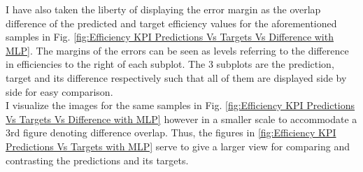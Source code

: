 \documentclass{report} %
\begin{document}
I have also taken the liberty of displaying the error margin as the overlap difference 
of the predicted and target efficiency values for the aforementioned samples in Fig. \ref{fig:Efficiency KPI Predictions Vs Targets Vs Difference with MLP}. 
The margins of the errors can be seen as levels referring to the difference in efficiencies to the right of each subplot. The 3 subplots are the prediction, target 
and its difference respectively such that all of them are displayed side by side for easy comparison. \\
I visualize the images for the same samples in Fig. \ref{fig:Efficiency KPI Predictions Vs Targets Vs Difference with MLP} however in a smaller scale to accommodate 
a 3rd figure denoting difference overlap. Thus, the figures in \ref{fig:Efficiency KPI Predictions Vs Targets with MLP} serve to give a larger view for comparing and 
contrasting the predictions and its targets.
\end{document}
